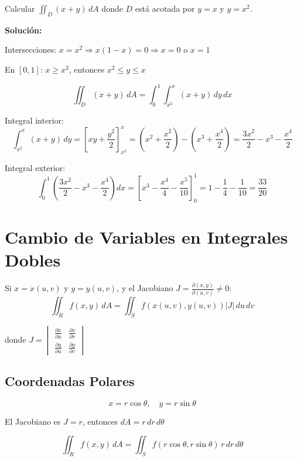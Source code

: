 \documentclass[12pt, a4paper]{book}
\begin{document}
\begin{ejemplo}
Calcular $\iint_D (x + y) \, dA$ donde $D$ está acotada por $y = x$ y $y = x^2$.

\textbf{Solución:}

Intersecciones: $x = x^2 \Rightarrow x(1-x) = 0 \Rightarrow x = 0$ o $x = 1$

En $[0,1]$: $x \geq x^2$, entonces $x^2 \leq y \leq x$

\[
\iint_D (x+y) \, dA = \int_0^1 \int_{x^2}^x (x+y) \, dy \, dx
\]

Integral interior:
\[
\int_{x^2}^x (x+y) \, dy = [xy + \frac{y^2}{2}]_{x^2}^x = (x^2 + \frac{x^2}{2}) - (x^3 + \frac{x^4}{2}) = \frac{3x^2}{2} - x^3 - \frac{x^4}{2}
\]

Integral exterior:
\[
\int_0^1 \left(\frac{3x^2}{2} - x^3 - \frac{x^4}{2}\right) dx = [x^3 - \frac{x^4}{4} - \frac{x^5}{10}]_0^1 = 1 - \frac{1}{4} - \frac{1}{10} = \frac{33}{20}
\]
\end{ejemplo}

\section{Cambio de Variables en Integrales Dobles}

\begin{teorema}
Si $x = x(u,v)$ y $y = y(u,v)$, y el Jacobiano $J = \frac{\partial(x,y)}{\partial(u,v)} \neq 0$:
\[
\iint_R f(x,y) \, dA = \iint_S f(x(u,v), y(u,v)) \left|J\right| \, du \, dv
\]

donde $J = \begin{vmatrix} \frac{\partial x}{\partial u} & \frac{\partial x}{\partial v} \\ \frac{\partial y}{\partial u} & \frac{\partial y}{\partial v} \end{vmatrix}$
\end{teorema}

\subsection{Coordenadas Polares}

\begin{transformacion}
\[
x = r\cos\theta, \quad y = r\sin\theta
\]

El Jacobiano es $J = r$, entonces $dA = r \, dr \, d\theta$

\[
\iint_R f(x,y) \, dA = \iint_S f(r\cos\theta, r\sin\theta) \, r \, dr \, d\theta
\]
\end{transformacion}
\end{document}
